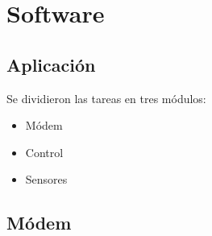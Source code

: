 \section{Software}
\subsection{Aplicación}
Se dividieron las tareas en tres módulos:
\begin{itemize}
  \item Módem 
  \item Control
  \item Sensores
\end{itemize}

\subsection*{Módem}

